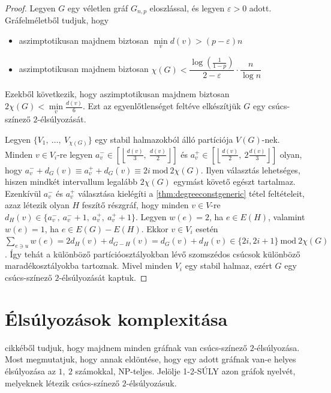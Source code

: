 \documentclass[12pt, a4paper]{report}
\theoremstyle{remark}
\theoremstyle{definition}
\begin{document}
\begin{proof}
Legyen $G$ egy véletlen gráf $G_{n,p}$ eloszlással, és legyen $\varepsilon > 0$ adott. Gráfelméletből tudjuk, hogy
\begin{itemize}
\item aszimptotikusan majdnem biztosan $\min\limits_v d(v) > (p - \varepsilon) n$
\item aszimptotikusan majdnem biztosan $\chi(G) < \dfrac{\log \left(\frac{1}{1 - p} \right)}{2 - \varepsilon} \cdot \dfrac{n}{\log n}$
\end{itemize}
Ezekből következik, hogy aszimptotikusan majdnem biztosan $2\chi(G) < \min\limits_v \frac{d(v)}{6}$. Ezt az egyenlőtlenséget feltéve elkészítjük $G$ egy csúcs-színező $2$-élsúlyozását.

Legyen $\lbrace V_1,\ \ldots,\ V_{\chi(G)} \rbrace$ egy stabil halmazokból álló partíciója $V(G)$-nek. Minden $v \in V_i$-re legyen $a_v^- \in \left\lbrack \left\lfloor \frac{d(v)}{3},\ \frac{d(v)}{2} \right\rfloor \right\rbrack$ és $a_v^+ \in \left\lbrack \left\lfloor \frac{d(v)}{2},\ 2\frac{d(v)}{3} \right\rfloor \right\rbrack$ olyan, hogy $a_v^- + d_G(v) \equiv a_v^+ + d_G(v) \equiv 2i\ \mathrm{mod}\ 2\chi(G)$. Ilyen választás lehetséges, hiszen mindkét intervallum legalább $2\chi(G)$ egymást követő egészt tartalmaz. Ezenkívül $a_v^-$ és $a_v^+$ választása kielégíti a \ref{thm:degreeconstgeneric} tétel feltételeit, azaz létezik olyan $H$ feszítő részgráf, hogy minden $v \in V$-re $d_H(v) \in \lbrace a_v^-,\ a_v^- + 1,\ a_v^+,\ a_v^+ + 1 \rbrace$. Legyen $w(e) = 2$, ha $e \in E(H)$, valamint $w(e) = 1$, ha $e \in E(G) - E(H)$. Ekkor $v \in V_i$ esetén $\sum\limits_{e \ni u} w(e) = 2d_H(v) + d_{G - H}(v) = d_G(v) + d_H(v) \in \lbrace 2i, 2i + 1 \rbrace\ \mathrm{mod}\ 2\chi(G)$. Így tehát a különböző partícióosztályokban lévő szomszédos csúcsok különböző maradékosztályokba tartoznak. Mivel minden $V_i$ egy stabil halmaz, ezért $G$ egy csúcs-színező $2$-élsúlyozását kaptuk.
\end{proof}

\chapter{Élsúlyozások komplexitása}
\citeauthor{AddarioBerry2008} \cite{AddarioBerry2008} cikkéből tudjuk, hogy majdnem minden gráfnak van csúcs-színező $2$-élsúlyozása. Most megmutatjuk, hogy annak eldöntése, hogy egy adott gráfnak van-e helyes élsúlyozása az $1,\ 2$ számokkal, NP-teljes. Jelölje 1-2-SÚLY azon gráfok nyelvét, melyeknek létezik csúcs-színező $2$-élsúlyozásuk.
\end{document}
